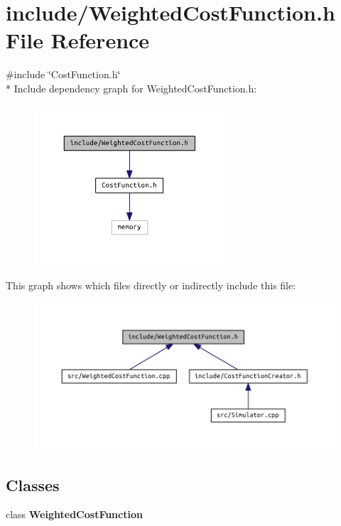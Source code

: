 \section{include/\+Weighted\+Cost\+Function.h File Reference}
\label{_weighted_cost_function_8h}
{\ttfamily \#include \char`\"{}Cost\+Function.\+h\char`\"{}}\\*
Include dependency graph for Weighted\+Cost\+Function.\+h\+:\nopagebreak
\begin{figure}[H]
\begin{center}
\leavevmode
\includegraphics[width=202pt]{_weighted_cost_function_8h__incl}
\end{center}
\end{figure}
This graph shows which files directly or indirectly include this file\+:\nopagebreak
\begin{figure}[H]
\begin{center}
\leavevmode
\includegraphics[width=350pt]{_weighted_cost_function_8h__dep__incl}
\end{center}
\end{figure}
\subsection*{Classes}
\begin{DoxyCompactItemize}
\item 
class {\bf Weighted\+Cost\+Function}
\end{DoxyCompactItemize}
